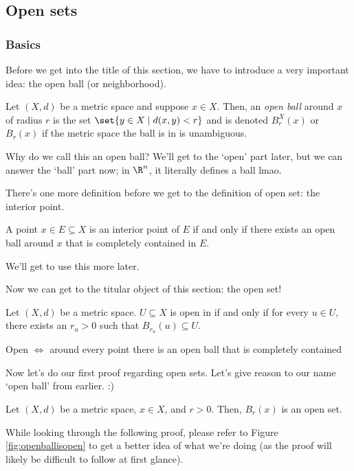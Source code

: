 \documentclass[class=article, crop=false]{standalone}
\begin{document}
\subsection{Open sets}

\subsubsection*{Basics}

Before we get into the title of this section, we have to introduce a very important idea: the open ball (or neighborhood).
\begin{defn}
    Let $(X,d)$ be a metric space and suppose $x \in X$. Then, an \textit{open ball} around $x$ of radius $r$ is the set $\set{y \in X \mid d(x,y) < r}$ and is denoted $B_r^X(x)$ or $B_r(x)$ if the metric space the ball is in is unambiguous.
\end{defn}
Why do we call this an open ball? We'll get to the `open' part later, but we can answer the `ball' part now; in $\R^n$, it literally defines a ball lmao.

There's one more definition before we get to the definition of open set: the interior point.
\begin{defn}
    A point $x \in E \subseteq X$ is an interior point of $E$ if and only if there exists an open ball around $x$ that is completely contained in $E$.
\end{defn}
We'll get to use this more later.

Now we can get to the titular object of this section: the open set!
\begin{defn}
    Let $(X,d)$ be a metric space. $U \subseteq X$ is open in if and only if for every $u \in U$, there exists an $r_u > 0$ such that $B_{r_u}(u) \subseteq U$.
\end{defn}
\begin{slogan}
    Open $\iff$ around every point there is an open ball that is completely contained
\end{slogan}

Now let's do our first proof regarding open sets. Let's give reason to our name `open ball' from earlier. :)
\begin{thm}{\label{thm:openballisopen}}
    Let $(X,d)$ be a metric space, $x \in X$, and $r > 0$. Then, $B_r(x)$ is an open set.
\end{thm}

While looking through the following proof, please refer to Figure \ref{fig:openballisopen} to get a better idea of what we're doing (as the proof will likely be difficult to follow at first glance).
\end{document}
